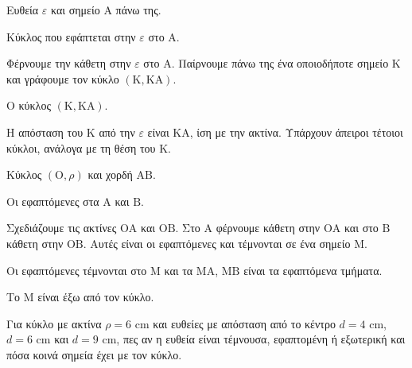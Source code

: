 \tixero Ευθεία $\varepsilon$ και σημείο $\mathrm{Α}$ πάνω της.\par
\tithelo Κύκλος που εφάπτεται στην $\varepsilon$ στο $\mathrm{Α}$.\par
\possindeo Φέρνουμε την κάθετη στην $\varepsilon$ στο $\mathrm{Α}$. Παίρνουμε πάνω της ένα οποιοδήποτε σημείο $\mathrm{Κ}$ και γράφουμε τον κύκλο $(\mathrm{Κ},\mathrm{ΚΑ})$.\par
\apantisi Ο κύκλος $(\mathrm{Κ},\mathrm{ΚΑ})$.\par
\elegxos Η απόσταση του $\mathrm{Κ}$ από την $\varepsilon$ είναι $\mathrm{ΚΑ}$, ίση με την ακτίνα. Υπάρχουν άπειροι τέτοιοι κύκλοι, ανάλογα με τη θέση του $\mathrm{Κ}$.

\tixero Κύκλος $(\mathrm{Ο},\rho)$ και χορδή $\mathrm{ΑΒ}$.\par
\tithelo Οι εφαπτόμενες στα $\mathrm{Α}$ και $\mathrm{Β}$.\par
\possindeo Σχεδιάζουμε τις ακτίνες $\mathrm{ΟΑ}$ και $\mathrm{ΟΒ}$. Στο $\mathrm{Α}$ φέρνουμε κάθετη στην $\mathrm{ΟΑ}$ και στο $\mathrm{Β}$ κάθετη στην $\mathrm{ΟΒ}$. Αυτές είναι οι εφαπτόμενες και τέμνονται σε ένα σημείο $\mathrm{Μ}$.\par
\apantisi Οι εφαπτόμενες τέμνονται στο $\mathrm{Μ}$ και τα $\mathrm{ΜΑ}$, $\mathrm{ΜΒ}$ είναι τα εφαπτόμενα τμήματα.\par
\elegxos Το $\mathrm{Μ}$ είναι έξω από τον κύκλο.

\begin{center}
\end{center}



\ex Για κύκλο με ακτίνα $\rho=6$ cm και ευθείες με απόσταση από το κέντρο $d=4$ cm, $d=6$ cm και $d=9$ cm, πες αν η ευθεία είναι τέμνουσα, εφαπτομένη ή εξωτερική και πόσα κοινά σημεία έχει με τον κύκλο.

